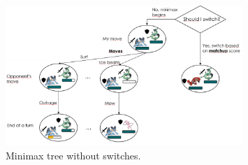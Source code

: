 \begin{figure}[H]
    \centering
    \includegraphics[width=0.8\textwidth]{images/minimax no switches.png}
    \caption{Minimax tree without switches.}
    \label{fig:minimax_without_switches}
\end{figure}
